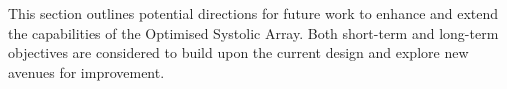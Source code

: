 \documentclass[12pt, a4paper, ukenglish]{article}
\begin{document}




    This section outlines potential directions for future work to enhance and extend the capabilities of the Optimised Systolic Array. Both short-term and long-term objectives are considered to build upon the current design and explore new avenues for improvement.
    
\end{document}
